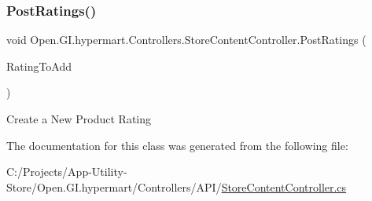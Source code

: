\subsubsection{\texorpdfstring{Post\+Ratings()}{PostRatings()}}
{\footnotesize\ttfamily void Open.\+G\+I.\+hypermart.\+Controllers.\+Store\+Content\+Controller.\+Post\+Ratings (\begin{DoxyParamCaption}\item[{\hyperlink{class_open_1_1_g_i_1_1hypermart_1_1_data_transformation_objects_1_1_rating_information_d_t_o}{Rating\+Information\+D\+TO}}]{Rating\+To\+Add }\end{DoxyParamCaption})}



Create a New Product Rating 



The documentation for this class was generated from the following file\+:\begin{DoxyCompactItemize}
\item 
C\+:/\+Projects/\+App-\/\+Utility-\/\+Store/\+Open.\+G\+I.\+hypermart/\+Controllers/\+A\+P\+I/\hyperlink{_store_content_controller_8cs}{Store\+Content\+Controller.\+cs}\end{DoxyCompactItemize}
